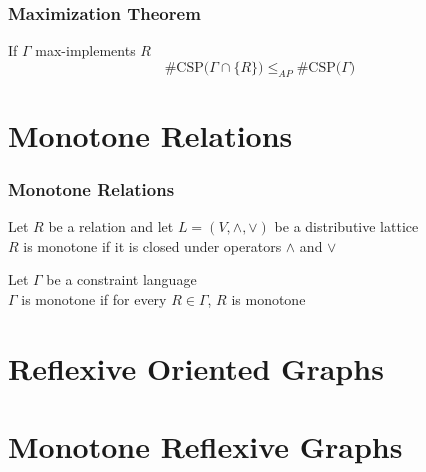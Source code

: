 \documentclass[a4paper,handout]{beamer}
\newcommand{\aple}{\le_{AP}}
\theoremstyle{definition}
\begin{document}
\begin{frame}
\frametitle{Maximization Theorem}
\begin{theorem}
If \(\Gamma\) max-implements \(R\)
\[\mathrm{\#CSP(}\Gamma \cap \{R\}\mathrm{)} \aple \mathrm{\#CSP(}\Gamma\mathrm{)}\]
\end{theorem}
\end{frame}

\section{Monotone Relations}

\begin{frame}
\frametitle{Monotone Relations}
\begin{definition}
Let \(R\) be a relation and let \(L=(V, \wedge, \vee)\) be a distributive lattice\\
\(R\) is monotone if it is closed under operators \(\wedge\) and \(\vee\) 
\end{definition}

\begin{definition}
Let \(\Gamma\) be a constraint language\\
\(\Gamma\) is monotone if for every \(R\in \Gamma\), \(R\) is monotone
\end{definition}
\end{frame}

\section{Reflexive Oriented Graphs}

\begin{frame}
\end{frame}


\section{Monotone Reflexive Graphs}

\begin{frame}
\end{frame}
\end{document}
